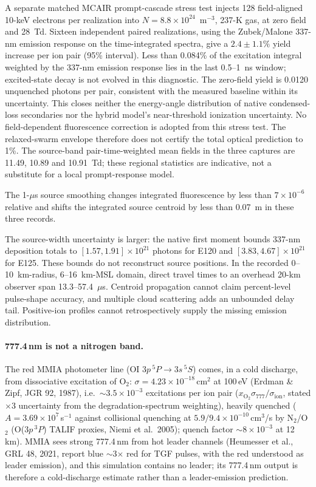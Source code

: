 \documentclass[11pt]{article}
\begin{document}
A separate matched MCAIR prompt-cascade stress test injects 128
field-aligned 10-keV electrons per realization into $N=8.8\times10^{24}$~m$^{-3}$,
237-K gas, at zero field and 28~Td. Sixteen independent paired realizations,
using the Zubek/Malone 337-nm emission response on the time-integrated
spectra, give a $2.4\pm1.1\%$ yield increase per ion pair (95\% interval).
Less than 0.084\% of the excitation integral weighted by the 337-nm emission
response lies in the last 0.5--1~ns window; excited-state decay is not evolved
in this diagnostic.
The zero-field yield is 0.0120 unquenched photons per pair, consistent with
the measured baseline within its uncertainty. This closes neither the
energy-angle distribution of native condensed-loss secondaries nor the
hybrid model's near-threshold ionization uncertainty. No field-dependent
fluorescence correction is adopted from this stress test. The relaxed-swarm
envelope therefore does not certify the total optical prediction to 1\%.
The source-band pair-time-weighted mean fields in the three captures are
11.49, 10.89 and 10.91~Td; these regional statistics are indicative, not a
substitute for a local prompt-response model.

The 1-$\mu$s source smoothing changes integrated fluorescence by less
than $7\times10^{-6}$ relative and shifts the integrated source centroid
by less than 0.07~m in these three records.

The source-width uncertainty is larger: the native first moment bounds
337-nm deposition totals to $[1.57,1.91]\times10^{21}$ photons for E120 and
$[3.83,4.67]\times10^{21}$ for E125. These bounds do not reconstruct source
positions. In the recorded 0--10~km-radius, 6--16~km-MSL domain, direct
travel times to an overhead 20-km observer span 13.3--57.4~$\mu$s.
Centroid propagation cannot claim percent-level pulse-shape accuracy, and
multiple cloud scattering adds an unbounded delay tail. Positive-ion
profiles cannot retrospectively supply the missing emission distribution.

\paragraph{777.4\,nm is not a nitrogen band.} The red MMIA photometer
line (OI $3p\,^5P \to 3s\,^5S$) comes, in a cold discharge, from
dissociative excitation of O$_2$: $\sigma = 4.23\times10^{-18}$\,cm$^2$
at 100\,eV (Erdman \& Zipf, JGR 92, 1987), i.e.\
$\sim 3.5\times10^{-3}$ excitations per ion pair
($x_{\mathrm{O}_2}\sigma_{777}/\sigma_\mathrm{ion}$, stated $\times 3$
uncertainty from the degradation-spectrum weighting), heavily quenched
($A = 3.69\times10^{7}$\,s$^{-1}$ against collisional quenching at
$5.9/9.4\times10^{-10}$\,cm$^3$/s by N$_2$/O$_2$ (O($3p\,^3P$)
TALIF proxies, Niemi et al.\ 2005); quench factor $\sim 8\times10^{-3}$
  at 12\,km). MMIA sees strong 777.4\,nm from hot leader channels
  (Heumesser et
  al., GRL 48, 2021, report blue $\sim$3$\times$ red for TGF pulses,
  with the red understood as leader emission), and this simulation
  contains no leader; its 777.4\,nm output is therefore a cold-discharge
  estimate rather than a leader-emission prediction.
\end{document}
